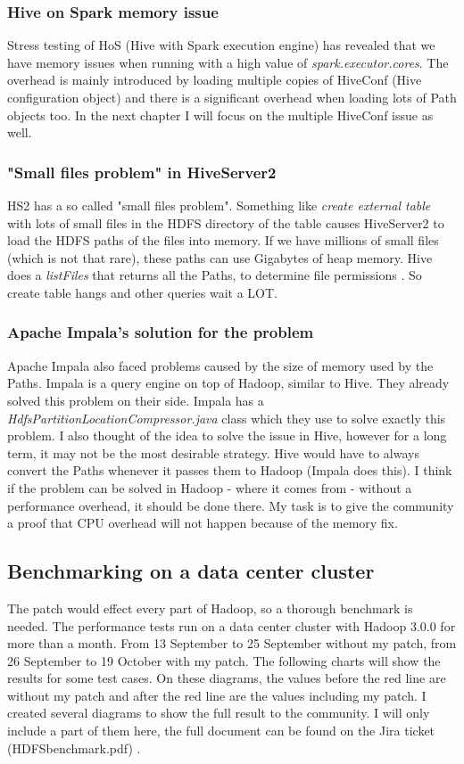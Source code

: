 \subsubsection{Hive on Spark memory issue}
Stress testing of HoS (Hive with Spark execution engine) has revealed that we have memory issues when running with a high value of \textit{spark.executor.cores}. The overhead is mainly introduced by loading multiple copies of HiveConf (Hive configuration object) and there is a significant overhead when loading lots of Path objects too. In the next chapter I will focus on the multiple HiveConf issue as well.

\subsubsection{"Small files problem" in HiveServer2}
HS2 has a so called "small files problem". Something like \textit{create external table} with lots of small files in the  HDFS directory of the table causes HiveServer2 to load the HDFS paths of the files into memory. If we have millions of small files (which is not that rare), these paths can use Gigabytes of heap memory. Hive does a \textit{listFiles} that returns all the Paths, to determine file permissions \etc. So create table hangs and other queries wait a LOT.

\subsubsection{Apache Impala's solution for the problem}
Apache Impala also faced problems caused by the size of memory used by the Paths. Impala is a query engine on top of Hadoop, similar to Hive. They already solved this problem on their side. Impala has a \textit{HdfsPartitionLocationCompressor.java} class which they use to solve exactly this problem. I also thought of the idea to solve the issue in Hive, however for a long term, it may not be the most desirable strategy. Hive would have to always convert the Paths whenever it passes them to Hadoop (Impala does this). I think if the problem can be solved in  Hadoop - where it comes from - without a performance overhead, it should be done there. My task is to give the community a proof that CPU overhead will not happen because of the memory fix. 

\subsection{Benchmarking on a data center cluster}
The patch would effect every part of Hadoop, so a thorough benchmark is needed. The performance tests run on a data center cluster with Hadoop 3.0.0 for more than a month. From 13 September to 25 September without my patch, from 26 September to 19 October with my patch. The following charts will show the results for some test cases. On these diagrams, the values before the red line are without my patch and after the red line are the values including my patch. I created several diagrams to show the full result to the community. I will only include a part of them here, the full document can be found on the Jira ticket (HDFSbenchmark.pdf) \cite{hdfs-path}.

